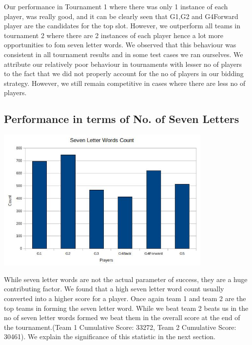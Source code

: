 \documentclass[11pt]{article}
\begin{document}
	Our performance in Tournament 1 where there was only 1 instance of each player, was really good, and it can be clearly seen that G1,G2 and G4Forward player are the candidates for the top slot. However, we outperform all teams in tournament 2 where there are 2 instances of each player hence a lot more opportunities to fom seven letter words. We observed that this behaviour was consistent in all tournament results and in some test cases we ran ourselves. We attribute our relatively poor behaviour in tournaments with lesser no of players to the fact that we did not properly account for the no of players in our bidding strategy. However, we still remain competitive in cases where there are less no of players.
	
	\subsection{Performance in terms of No. of Seven Letters}
	
	\includegraphics[width=0.8\textwidth]{SevenCount}
	
	While seven letter words are not the actual parameter of success, they are a huge contributing factor. We found that a high seven letter word count usually converted into a higher score for a player. Once again team 1 and team 2 are the top teams in forming the seven letter word. While we beat team 2 beats us in the no of seven letter words formed we beat them in the overall score at the end of the tournament.(Team 1 Cumulative Score: 33272, Team 2 Cumulative Score: 30461). We explain the significance of this statistic in the next section.
	
\end{document}
